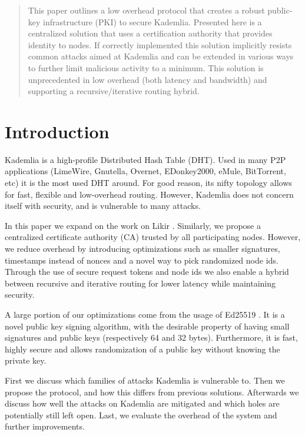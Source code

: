 \documentclass[12pt]{article}
\begin{document}
\maketitle

\begin{abstract} \noindent This paper outlines a low overhead protocol that
creates a robust public-key infrastructure (PKI) to secure Kademlia. Presented
here is a centralized solution that uses a certification authority that
provides identity to nodes. If correctly implemented this solution implicitly
resists common attacks aimed at Kademlia and can be extended in various ways to
further limit malicious activity to a minimum. This solution is unprecedented
in low overhead (both latency and bandwidth) and supporting a
recursive/iterative routing hybrid. \end{abstract}

\section{Introduction}\label{introduction} Kademlia \cite{kademlia} is a
high-profile Distributed Hash Table (DHT). Used in many P2P applications
(LimeWire, Gnutella, Overnet, EDonkey2000, eMule, BitTorrent, etc) it is the
most used DHT around. For good reason, its nifty topology allows for fast,
flexible and low-overhead routing. However, Kademlia does not concern itself
with security, and is vulnerable to many attacks.

In this paper we expand on the work on Likir \cite{aiello2008tempering}. Similarly,
we propose a centralized certificate authority (CA) trusted by all
participating nodes. However, we reduce overhead by introducing optimizations
such as smaller signatures, timestamps instead of nonces and a novel way to
pick randomized node ids. Through the use of secure request tokens and node ids
we also enable a hybrid between recursive and iterative routing for lower
latency while maintaining security.

A large portion of our optimizations come from the usage of Ed25519
\cite{bernstein2011high}. It is a novel public key signing algorithm, with the
desirable property of having small signatures and public keys (respectively 64
and 32 bytes). Furthermore, it is fast, highly secure and allows randomization
of a public key without knowing the private key.

First we discuss which families of attacks Kademlia is vulnerable to. Then we
propose the protocol, and how this differs from previous solutions. Afterwards
we discuss how well the attacks on Kademlia are mitigated and which holes are
potentially still left open. Last, we evaluate the overhead of the system and
further improvements.
\end{document}
